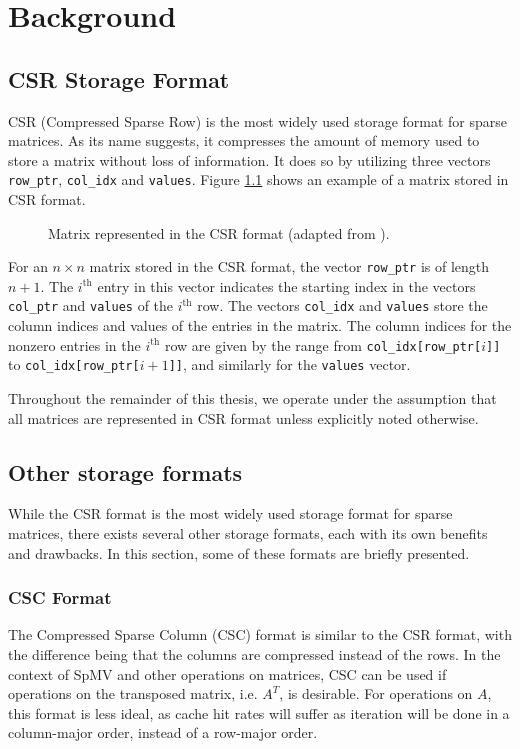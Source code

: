\chapter{Background}

\section{CSR Storage Format}
CSR (Compressed Sparse Row) is the most widely used storage format for sparse matrices. As its name suggests, it compresses the amount of memory used to store a matrix without loss of information. It does so by utilizing three vectors \texttt{row\_ptr}, \texttt{col\_idx} and \texttt{values}. Figure \ref{fig:csrformat} shows an example of a matrix stored in CSR format.

\begin{figure}[ht]
    \centering
    \caption{Matrix represented in the CSR format (adapted from \cite{gupta2024gamgi}).}
    \label{fig:csrformat}
\end{figure}

For an \(n \times n\) matrix stored in the CSR format, the vector \texttt{row\_ptr} is of length \(n + 1\). The \(i^{\text{th}}\) entry in this vector indicates the starting index in the vectors \texttt{col\_ptr} and \texttt{values} of the \(i^{\text{th}}\) row. The vectors \texttt{col\_idx} and \texttt{values} store the column indices and values of the entries in the matrix. The column indices for the nonzero entries in the \(i^{\text{th}}\) row are given by the range from \texttt{col\_idx[row\_ptr[}\(i\)\texttt{]]} to \texttt{col\_idx[row\_ptr[}\(i+1\)\texttt{]]}, and similarly for the \texttt{values} vector.
\medskip

Throughout the remainder of this thesis, we operate under the assumption that all matrices are represented in CSR format unless explicitly noted otherwise.



\section{Other storage formats}
While the CSR format is the most widely used storage format for sparse matrices, there exists several other storage formats, each with its own benefits and drawbacks. In this section, some of these formats are briefly presented.


\subsection{CSC Format}
The Compressed Sparse Column (CSC) format is similar to the CSR format, with the difference being that the columns are compressed instead of the rows. In the context of SpMV and other operations on matrices, CSC can be used if operations on the transposed matrix, i.e. \(A^{T}\), is desirable. For operations on \(A\), this format is less ideal, as cache hit rates will suffer as iteration will be done in a column-major order, instead of a row-major order.

